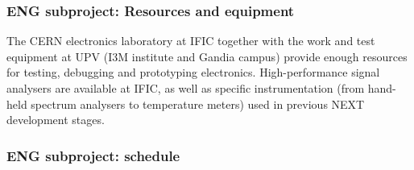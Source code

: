 %
%
%
%
%
%
\subsubsection*{ENG subproject: Resources and equipment}

The CERN electronics laboratory at IFIC together with the work and test equipment at UPV (I3M institute and Gandia campus) provide enough resources for testing, debugging and prototyping electronics. High-performance signal analysers are available at IFIC, as well as specific instrumentation (from hand-held spectrum analysers to temperature meters) used in previous NEXT development stages.

\subsubsection*{ENG subproject: schedule}


